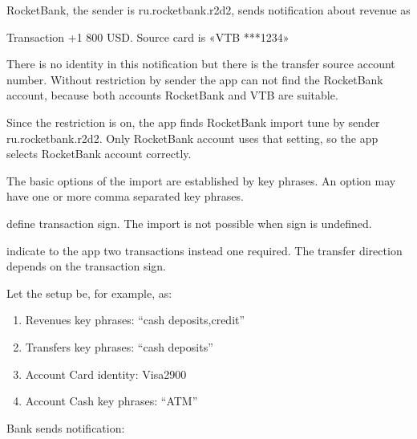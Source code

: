 \documentclass[a4paper,10pt,english]{sphinxmanual}
\begin{document}
\sphinxAtStartPar
RocketBank, the sender is ru.rocketbank.r2d2, sends notification about revenue as

\begin{sphinxVerbatim}[commandchars=\\\{\}]
Transaction \PYGZgt{}\PYGZgt{} +1 800 USD.
Source card is «VTB ***1234»
\end{sphinxVerbatim}

\sphinxAtStartPar
There is no identity in this notification but there is the transfer source account number. Without
restriction by sender the app can not find the RocketBank account, because both accounts
RocketBank and VTB are suitable.

\sphinxAtStartPar
Since the restriction is on, the app finds RocketBank import tune by sender ru.rocketbank.r2d2.
Only RocketBank account uses that setting, so the app selects RocketBank account correctly.

\sphinxAtStartPar
The basic options of the import are established by key phrases. An option may have one or more
comma separated key phrases.

\sphinxAtStartPar
{} define transaction sign. The import is not possible when
sign is undefined.

\sphinxAtStartPar
{} indicate to the app two transactions instead one required.
The transfer direction depends on the transaction sign.

\sphinxAtStartPar
Let the setup be, for example, as:
\begin{enumerate}
%
\item {} 
\sphinxAtStartPar
Revenues key phrases: “cash deposits,credit”

\item {} 
\sphinxAtStartPar
Transfers key phrases: “cash deposits”

\item {} 
\sphinxAtStartPar
Account Card identity: Visa2900

\item {} 
\sphinxAtStartPar
Account Cash key phrases: “ATM”

\end{enumerate}

\sphinxAtStartPar
Bank sends notification:

\begin{sphinxVerbatim}[commandchars=\\\{\}]
          
\end{sphinxVerbatim}
\end{document}
